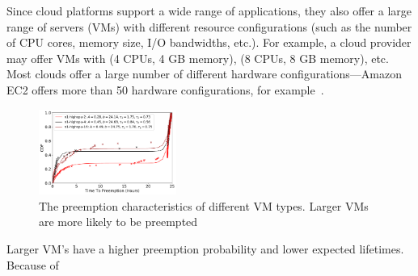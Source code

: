 Since cloud platforms support a wide range of applications, they also offer a large range of servers (VMs) with different resource configurations (such as the number of CPU cores, memory size, I/O bandwidths, etc.). 
For example, a cloud provider may offer VMs with (4 CPUs, 4 GB memory), (8 CPUs, 8 GB memory), etc.
Most clouds offer a large number of different hardware configurations---Amazon EC2 offers more than 50 hardware configurations, for example~\cite{amazon-ec2-instance-types}. 

\begin{figure}
  \centering 
  \includegraphics[width=0.4\textwidth]{../graphs/cdf_comparison_3.pdf}
  \caption{The preemption characteristics of different VM types. Larger VMs are more likely to be preempted}
  \label{fig:cdf-comparison}
\end{figure}

Larger VM's have a higher preemption probability and lower expected lifetimes.
Because of ~\cite{gcp-preempt-faq}









